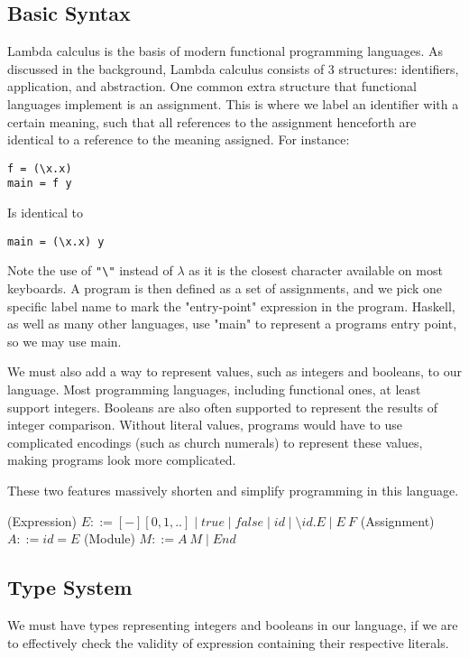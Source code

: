 \subsection{Basic Syntax}
Lambda calculus is the basis of modern functional programming languages. As discussed in the background, Lambda calculus consists of 3 structures: identifiers, application, and abstraction. One common extra structure that functional languages implement is an assignment. This is where we label an identifier with a certain meaning, such that all references to the assignment henceforth are identical to a reference to the meaning assigned. For instance:
\begin{lstlisting}[]
f = (\x.x)
main = f y
\end{lstlisting}
Is identical to
\begin{lstlisting}[]
main = (\x.x) y
\end{lstlisting}
Note the use of \verb|"\"| instead of \(\lambda\) as it is the closest character available on most keyboards. A program is then defined as a set of assignments, and we pick one specific label name to mark the "entry-point" expression in the program. Haskell, as well as many other languages, use "main" to represent a programs entry point, so we may use main. 

We must also add a way to represent values, such as integers and booleans, to our language. Most programming languages, including functional ones, at least support integers. Booleans are also often supported to represent the results of integer comparison. Without literal values, programs would have to use complicated encodings (such as church numerals) to represent these values, making programs look more complicated. 

These two features massively shorten and simplify programming in this language.

\begin{syntax}
(Expression) \(E ::= [-][0, 1, ..] \mid true \mid false \mid id \mid \setminus id. E \mid E\:F\)\newline
(Assignment) \(A ::= id = E\)\newline
(Module) \(M ::= A\: M \mid End\)
\end{syntax}

\subsection{Type System}
We must have types representing integers and booleans in our language, if we are to effectively check the validity of expression containing their respective literals. 

